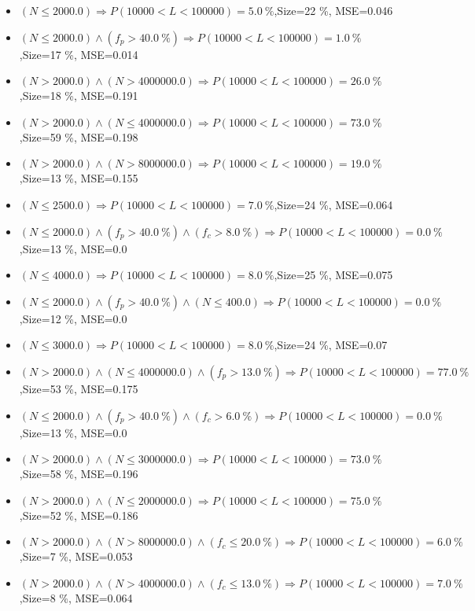 \documentclass[numbered]{CSL}
\begin{document}
\begin{itemize}
\item $(N \leq 2000.0) \Rightarrow P(10 000 < L < 100 000) = 5.0~\%$,\hfill Size=22 \%, MSE=0.046
\item $(N \leq 2000.0) \land (f_p > 40.0~\%) \Rightarrow P(10 000 < L < 100 000) = 1.0~\%$,\hfill Size=17 \%, MSE=0.014
\item $(N > 2000.0) \land (N > 4000000.0) \Rightarrow P(10 000 < L < 100 000) = 26.0~\%$,\hfill Size=18 \%, MSE=0.191
\item $(N > 2000.0) \land (N \leq 4000000.0) \Rightarrow P(10 000 < L < 100 000) = 73.0~\%$,\hfill Size=59 \%, MSE=0.198
\item $(N > 2000.0) \land (N > 8000000.0) \Rightarrow P(10 000 < L < 100 000) = 19.0~\%$,\hfill Size=13 \%, MSE=0.155
\item $(N \leq 2500.0) \Rightarrow P(10 000 < L < 100 000) = 7.0~\%$,\hfill Size=24 \%, MSE=0.064
\item $(N \leq 2000.0) \land (f_p > 40.0~\%) \land (f_c > 8.0~\%) \Rightarrow P(10 000 < L < 100 000) = 0.0~\%$,\hfill Size=13 \%, MSE=0.0
\item $(N \leq 4000.0) \Rightarrow P(10 000 < L < 100 000) = 8.0~\%$,\hfill Size=25 \%, MSE=0.075
\item $(N \leq 2000.0) \land (f_p > 40.0~\%) \land (N \leq 400.0) \Rightarrow P(10 000 < L < 100 000) = 0.0~\%$,\hfill Size=12 \%, MSE=0.0
\item $(N \leq 3000.0) \Rightarrow P(10 000 < L < 100 000) = 8.0~\%$,\hfill Size=24 \%, MSE=0.07
\item $(N > 2000.0) \land (N \leq 4000000.0) \land (f_p > 13.0~\%) \Rightarrow P(10 000 < L < 100 000) = 77.0~\%$,\hfill Size=53 \%, MSE=0.175
\item $(N \leq 2000.0) \land (f_p > 40.0~\%) \land (f_c > 6.0~\%) \Rightarrow P(10 000 < L < 100 000) = 0.0~\%$,\hfill Size=13 \%, MSE=0.0
\item $(N > 2000.0) \land (N \leq 3000000.0) \Rightarrow P(10 000 < L < 100 000) = 73.0~\%$,\hfill Size=58 \%, MSE=0.196
\item $(N > 2000.0) \land (N \leq 2000000.0) \Rightarrow P(10 000 < L < 100 000) = 75.0~\%$,\hfill Size=52 \%, MSE=0.186
\item $(N > 2000.0) \land (N > 8000000.0) \land (f_c \leq 20.0~\%) \Rightarrow P(10 000 < L < 100 000) = 6.0~\%$,\hfill Size=7 \%, MSE=0.053
\item $(N > 2000.0) \land (N > 4000000.0) \land (f_c \leq 13.0~\%) \Rightarrow P(10 000 < L < 100 000) = 7.0~\%$,\hfill Size=8 \%, MSE=0.064

\end{itemize}
\end{document}

